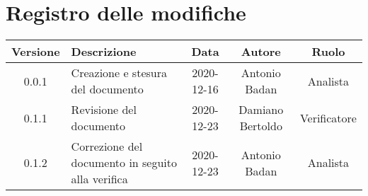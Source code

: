 \section*{Registro delle modifiche}

\begin{center}
	\begin{longtable}{|c|p{5cm}|c|c|c|}
	\hline
	\rowcolor{lighter-grayer}
	\textbf{Versione} & \textbf{Descrizione} & \textbf{Data} & \textbf{Autore} & \textbf{Ruolo} \\
	\hline
	\endfirsthead


	\hline
	0.0.1 & Creazione e stesura del documento & 2020-12-16 & Antonio Badan & Analista \\
	\hline
	0.1.1 & Revisione del documento & 2020-12-23 & Damiano Bertoldo & Verificatore \\
	\hline
	0.1.2 & Correzione del documento in seguito alla verifica & 2020-12-23 & Antonio Badan & Analista \\
	\hline

	\end{longtable}
\end{center}